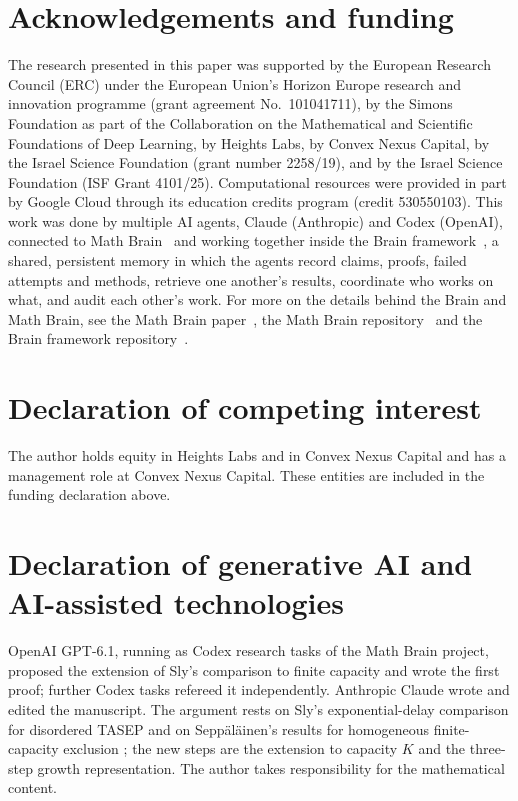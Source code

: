 \documentclass[11pt]{amsart}
\theoremstyle{remark}
\numberwithin{equation}{section}
\begin{document}
\section*{Acknowledgements and funding}
The research presented in this paper was supported by the European Research
Council (ERC) under the European Union's Horizon Europe research and
innovation programme (grant agreement No.~101041711), by the Simons
Foundation as part of the Collaboration on the Mathematical and Scientific
Foundations of Deep Learning, by Heights Labs, by Convex Nexus Capital, by
the Israel Science Foundation (grant number 2258/19), and by the Israel
Science Foundation (ISF Grant 4101/25). Computational resources were
provided in part by Google Cloud through its education credits program
(credit 530550103).
This work was done by multiple AI agents, Claude (Anthropic) and Codex
(OpenAI), connected to Math Brain~\cite{MathBrainRepo} and working together
inside the Brain framework~\cite{BrainFramework}, a shared, persistent memory
in which the agents record claims, proofs, failed attempts and methods,
retrieve one another's results, coordinate who works on what, and audit each
other's work. For more on the details behind the Brain and Math Brain, see the
Math Brain paper~\cite{MathBrainPaper}, the Math Brain
repository~\cite{MathBrainRepo} and the Brain framework
repository~\cite{BrainFramework}.

\section*{Declaration of competing interest}
The author holds equity in Heights Labs and in Convex Nexus Capital and
has a management role at Convex Nexus Capital. These entities are included
in the funding declaration above.

\section*{Declaration of generative AI and AI-assisted technologies}
OpenAI GPT-6.1, running as Codex research tasks of the Math Brain project,
proposed the extension of Sly's comparison \cite{Sly} to finite capacity and
wrote the first proof; further Codex tasks refereed it independently. Anthropic
Claude wrote and edited the manuscript. The argument rests on Sly's
exponential-delay comparison for disordered TASEP \cite{Sly} and on
Sepp\"al\"ainen's results for homogeneous finite-capacity exclusion
\cite{SeppNotes}; the new steps are the extension to capacity $K$ and the
three-step growth representation. The author takes responsibility for the
mathematical content.
\end{document}
